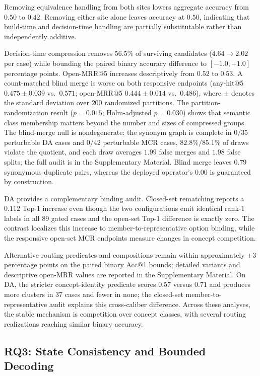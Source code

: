 \documentclass[letterpaper]{article} %
\begin{document}
Removing equivalence handling from both sites lowers aggregate accuracy from $0.50$ to $0.42$.
Removing either site alone leaves accuracy at $0.50$, indicating that build-time and decision-time handling are partially substitutable rather than independently additive.

Decision-time compression removes $56.5\%$ of surviving candidates ($4.64 \rightarrow 2.02$ per case) while bounding the paired binary accuracy difference to $[-1.0,+1.0]$ percentage points.
Open-MRR@5 increases descriptively from $0.52$ to $0.53$.
A count-matched blind merge is worse on both responsive endpoints (any-hit@5 $0.475\pm0.039$ vs.\ $0.571$; open-MRR@5 $0.444\pm0.014$ vs.\ $0.486$), where $\pm$ denotes the standard deviation over $200$ randomized partitions.
The partition-randomization result ($p=0.015$; Holm-adjusted $p=0.030$) shows that semantic class membership matters beyond the number and sizes of compressed groups.
The blind-merge null is nondegenerate: the synonym graph is complete in $0/35$ perturbable DA cases and $0/42$ perturbable MCR cases, $82.8\%/85.1\%$ of draws violate the quotient, and each draw averages $1.99$ false merges and $1.98$ false splits; the full audit is in the Supplementary Material.
Blind merge leaves $0.79$ synonymous duplicate pairs, whereas the deployed operator's $0.00$ is guaranteed by construction.

DA provides a complementary binding audit.
Closed-set rematching reports a $0.112$ Top-1 increase even though the two configurations emit identical rank-1 labels in all $89$ gated cases and the open-set Top-1 difference is exactly zero.
The contrast localizes this increase to member-to-representative option binding, while the responsive open-set MCR endpoints measure changes in concept competition.

Alternative routing predicates and compositions remain within approximately $\pm3$ percentage points on the paired binary Acc@1 bounds; detailed variants and descriptive open-MRR values are reported in the Supplementary Material.
On DA, the stricter concept-identity predicate scores $0.57$ versus $0.71$ and produces more clusters in $37$ cases and fewer in none; the closed-set member-to-representative audit explains this cross-caliber difference.
Across these analyses, the stable mechanism is competition over concept classes, with several routing realizations reaching similar binary accuracy.

\subsection{RQ3: State Consistency and Bounded Decoding}
\label{sec:res-state}
\end{document}
